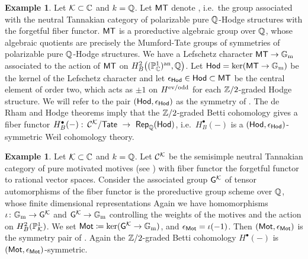 \documentclass[twoside,leqno]{article}
\numberwithin{equation}{section}
\theoremstyle{plain}
\theoremstyle{definition}
\newtheorem{example}[equation]{Example}
\begin{document}
\begin{example} \label{ex:Z/2Hodge}
    Let $\mathcal K \subset \mathbb C$  and $k = \mathbb Q$. Let $\mathsf{MT}$ denote  \cite{DeligneMilne,milne-MT}, i.e.\ the group associated with the neutral Tannakian category of polarizable pure $\mathbb Q$-Hodge structures with the forgetful fiber functor. $\mathsf{MT}$ is a proreductive algebraic group over $\mathbb Q$,  whose algebraic quotients are precisely the Mumford-Tate groups of symmetries of polarizable pure $\mathbb Q$-Hodge structures. 
    We have a Lefschetz character $\mathsf{MT} \to \mathbb G_\mathrm{m}$ associated to the action of $\mathsf{MT}$ on $H^2_{B}\big((\mathbb P^1_{\mathbb C})^{\operatorname{an}},\mathbb Q\big)$.
    Let $\mathsf{Hod} = \ker(\mathsf{MT} \to \mathbb G_\mathrm{m})$ be the kernel of the Lefschetz character and let $\epsilon_{\mathsf{Hod}} \in \mathsf{Hod} \subset \mathsf{MT}$ be the central element of order two, which acts as $\pm 1$ on $H^{\mathrm{ev}/\mathrm{odd}}$ for each $\mathbb Z/2$-graded Hodge structure. We will refer to the pair  $(\mathsf{Hod},\epsilon_{\mathsf{Hod}})$ as the symmetry of . The de Rham and  Hodge theorems imply that  the $\mathbb Z/2$-graded Betti  cohomology  gives a fiber functor $H^{\bullet}_{B}(-) \, \colon \, \mathcal{C}^{\mathcal K}/\mathsf{Tate} \ \to \ \mathsf{Rep}_{\mathbb Q}(\mathsf{Hod})$, i.e.\ $H^{\bullet}_{B}(-)$ is a 
    $(\mathsf{Hod},\epsilon_{\mathsf{Hod}})$-symmetric Weil cohomology theory. 
\end{example}

\begin{example} \label{ex:MotM}
    Let $\mathcal K \subset \mathbb C$ and $k = \mathbb Q$.
    Let $\mathcal{C}^{\mathcal K}$ be the semisimple neutral Tannakian category of pure motivated motives (see \cite{Andre_Pour_une_theorie_inconditionnelle_des_motifs,Andre-book}) with fiber functor the forgetful functor to rational vector spaces. Consider the associated group $\mathsf{G}^{\mathcal K}$ of tensor automorphisms of the fiber functor is the proreductive group scheme over $\mathbb Q$, whose finite dimensional representations
    Again we have homomorphisms $\iota \colon \mathbb G_\mathrm{m} \to \mathsf{G}^{\mathcal K}$ and $\mathsf{G}^{\mathcal K} \to \mathbb G_\mathrm{m}$ controlling the weights of the motives and the action on  $H^{2}_{B}(\mathbb P^1_{\mathcal K})$. We set $\mathsf{Mot} \coloneqq \ker(\mathsf{G}^{\mathcal K} \to \mathbb G_\mathrm{m})$, and $\epsilon_{\mathsf{Mot}} = \iota(-1)$. Then $\left(\mathsf{Mot},\epsilon_{\mathsf{Mot}}\right)$ is the symmetry pair of  . Again the $\mathbb Z/2$-graded Betti cohomology $H^{\bullet}(-)$  is     $\left(\mathsf{Mot},\epsilon_{\mathsf{Mot}}\right)$-symmetric.
\end{example}
\end{document}

